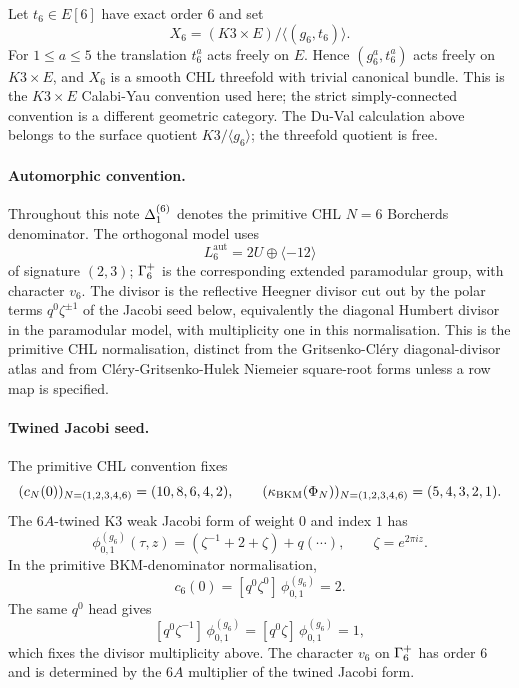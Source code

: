 Let $t_6\in E[6]$ have exact order $6$ and set
\[
  X_6=(K3\times E)/\langle(g_6,t_6)\rangle .
\]
For $1\leq a\leq5$ the translation $t_6^a$ acts freely on $E$.
Hence $(g_6^a,t_6^a)$ acts freely on $K3\times E$, and $X_6$ is a
smooth CHL threefold with trivial canonical bundle. This is the
$K3\times E$ Calabi-Yau convention used here; the strict
simply-connected convention is a different geometric category. The
Du-Val calculation above belongs to the surface quotient
$K3/\langle g_6\rangle$; the threefold quotient is free.

\paragraph{Automorphic convention.}
Throughout this note $\Delta_{1}^{(6)}$ denotes the primitive CHL $N=6$
Borcherds denominator. The orthogonal model uses
\[
  L_6^{\mathrm{aut}}=2U\oplus\langle -12\rangle
\]
of signature $(2,3)$; $\Gamma_{6}^{+}$ is the corresponding extended
paramodular group, with character $v_6$. The divisor is the reflective
Heegner divisor cut out by the polar terms
$q^0\zeta^{\pm1}$ of the Jacobi seed below, equivalently the diagonal
Humbert divisor in the paramodular model, with multiplicity one in this
normalisation. This is the primitive CHL normalisation, distinct from
the Gritsenko-Cl\'ery diagonal-divisor atlas and from
Cl\'ery-Gritsenko-Hulek Niemeier square-root forms unless a row map is
specified.

\paragraph{Twined Jacobi seed.}
The primitive CHL convention fixes
\[
  (c_N(0))_{N=(1,2,3,4,6)}=(10,8,6,4,2),
  \qquad
  (\kappa_{\mathrm{BKM}}(\Phi_N))_{N=(1,2,3,4,6)}=(5,4,3,2,1).
\]
The $6A$-twined K3 weak Jacobi form of weight $0$ and index $1$ has
\[
  \phi^{(g_6)}_{0,1}(\tau,z)
  =(\zeta^{-1}+2+\zeta)+q(\cdots),
  \qquad \zeta=e^{2\pi iz}.
\]
In the primitive BKM-denominator normalisation,
\[
  c_6(0)=[q^0\zeta^0]\,\phi^{(g_6)}_{0,1}=2 .
\]
The same $q^0$ head gives
\[
  [q^0\zeta^{-1}]\,\phi^{(g_6)}_{0,1}
  =[q^0\zeta]\,\phi^{(g_6)}_{0,1}=1,
\]
which fixes the divisor multiplicity above.
The character $v_6$ on $\Gamma_{6}^{+}$ has order $6$ and is determined by
the $6A$ multiplier of the twined Jacobi form.


